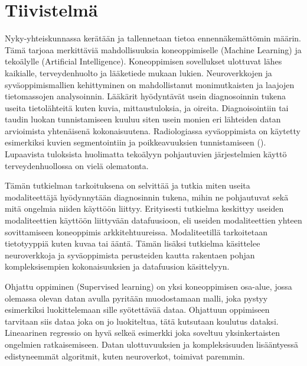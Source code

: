 \chapter*{Tiivistelmä}
Nyky-yhteiskunnassa kerätään ja tallennetaan tietoa ennennäkemättömin määrin. Tämä tarjoaa merkittäviä mahdollisuuksia koneoppimiselle (Machine Learning) ja tekoälylle (Artificial Intelligence). Koneoppimisen sovellukset ulottuvat lähes kaikialle, terveydenhuolto ja lääketiede mukaan lukien. Neuroverkkojen ja syväoppimismallien kehittyminen on mahdollistanut monimutkaisten ja laajojen tietomassojen analysoinnin. Lääkärit hyödyntävät usein diagnosoinnin tukena useita tietolähteitä kuten kuvia, mittaustuloksia, ja oireita. Diagnoisointiin tai taudin luokan tunnistamiseen kuuluu siten usein monien eri lähteiden datan arvioimista yhtenäisenä kokonaisuutena. Radiologiassa syväoppimista on käytetty esimerkiksi kuvien segmentointiin ja poikkeavuuksien tunnistamiseen (\cite{lee2017deep}). Lupaavista tuloksista huolimatta tekoälyyn pohjautuvien järjestelmien käyttö terveydenhuollossa on vielä olematonta.

Tämän tutkielman tarkoituksena on selvittää ja tutkia miten useita modaliteettäjä hyödynnytään diagnosinnin tukena, mihin ne pohjautuvat sekä mitä ongelmia niiden käyttöön liittyy. Erityisesti tutkielma keskittyy useiden modaliteettien käyttöön liittyvään datafuusioon, eli useiden modaliteettien yhteen sovittamiseen koneoppimis arkkitehtuureissa. Modaliteetillä tarkoitetaan tietotyyppiä kuten kuvaa tai ääntä. Tämän lisäksi tutkielma käsittelee neuroverkkoja ja syväoppimista perusteiden kautta rakentaen pohjan kompleksisempien kokonaisuuksien ja datafuusion käsittelyyn.

Ohjattu oppiminen (Supervised learning) on yksi koneoppimisen osa-alue, jossa olemassa olevan datan avulla pyritään muodostamaan malli, joka pystyy esimerkiksi luokittelemaan sille syötettävää dataa. Ohjattuun oppimiseen tarvitaan siis dataa joka on jo luokiteltua, tätä kutsutaan koulutus dataksi. Lineaarinen regressio on hyvä selkeä esimerkki joka soveltuu yksinkertaisten ongelmien ratkaisemiseen. Datan ulottuvuuksien ja kompleksisuuden lisääntyessä edistyneemmät algoritmit, kuten neuroverkot, toimivat paremmin. 

